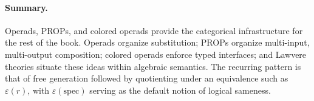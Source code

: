 \paragraph{Summary.}
Operads, PROPs, and colored operads provide the categorical infrastructure for the rest of the book. Operads organize substitution; PROPs organize multi-input, multi-output composition; colored operads enforce typed interfaces; and Lawvere theories situate these ideas within algebraic semantics. The recurring pattern is that of free generation followed by quotienting under an equivalence such as \(\varepsilon(r)\), with \(\varepsilon(\mathrm{spec})\) serving as the default notion of logical sameness.
